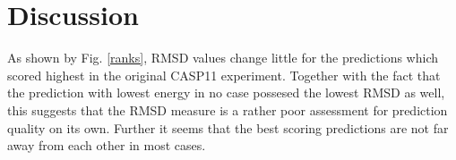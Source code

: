 \documentclass[11pt,a4paper]{article}
\begin{document}
\section{Discussion}
As shown by Fig. \ref{ranks}, RMSD values change little for the predictions which scored highest in the original CASP11 experiment. Together with the fact that the prediction with lowest energy in no case possesed the lowest RMSD as well, this suggests that the RMSD measure is a rather poor assessment for prediction quality on its own. Further it seems that the best scoring predictions are not far away from each other in most cases.\\

%



\end{document}
